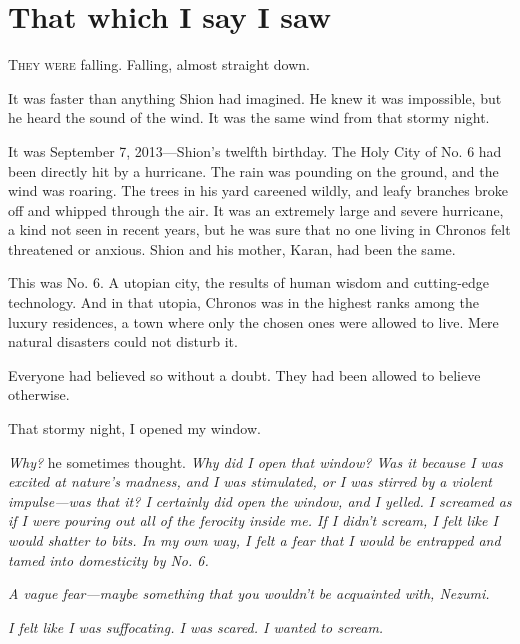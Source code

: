 
\chapter{That which I say I saw}


\lettrine{T}{hey were} falling. Falling, almost straight down.

It was faster than anything Shion had imagined. He knew it was
impossible, but he heard the sound of the wind. It was the same wind
from that stormy night.

It was September 7, 2013---Shion's twelfth birthday. The Holy City of No.
6 had been directly hit by a hurricane. The rain was pounding on the
ground, and the wind was roaring. The trees in his yard careened wildly,
and leafy branches broke off and whipped through the air. It was an
extremely large and severe hurricane, a kind not seen in recent years,
but he was sure that no one living in Chronos felt threatened or
anxious. Shion and his mother, Karan, had been the same.

This was No. 6. A utopian city, the results of human wisdom and
cutting-edge technology. And in that utopia, Chronos was in the highest
ranks among the luxury residences, a town where only the chosen ones
were allowed to live. Mere natural disasters could not disturb it.

Everyone had believed so without a doubt. They had been allowed to
believe otherwise.

That stormy night, I opened my window.

\emph{Why?} he sometimes thought. \emph{Why did I open that window? Was it because I
was excited at nature's madness, and I was stimulated, or I was stirred
by a violent impulse---was that it? I certainly did open the window, and I
yelled. I screamed as if I were pouring out all of the ferocity inside
me. If I didn't scream, I felt like I would shatter to bits. In my own
way, I felt a fear that I would be entrapped and tamed into domesticity
by No. 6.}

\emph{A vague fear---maybe something that you wouldn't be acquainted with,
Nezumi.}

\emph{I felt like I was suffocating. I was scared. I wanted to scream.}

